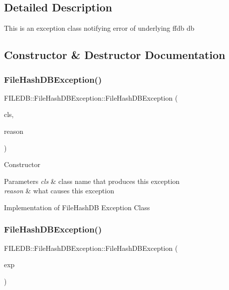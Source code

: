 \subsection{Detailed Description}
This is an exception class notifying error of underlying ffdb db 

\subsection{Constructor \& Destructor Documentation}
\mbox{\label{classFILEDB_1_1FileHashDBException_ae549056e12f10f0bb24e0875a70ec57b}} 
\subsubsection{\texorpdfstring{FileHashDBException()}{FileHashDBException()}\hspace{0.1cm}{\footnotesize\ttfamily [1/9]}}
{\footnotesize\ttfamily F\+I\+L\+E\+D\+B\+::\+File\+Hash\+D\+B\+Exception\+::\+File\+Hash\+D\+B\+Exception (\begin{DoxyParamCaption}\item[{const std\+::string \&}]{cls,  }\item[{const std\+::string \&}]{reason }\end{DoxyParamCaption})}

Constructor 
\begin{DoxyParams}{Parameters}
{\em cls} & class name that produces this exception \\
\hline
{\em reason} & what causes this exception\\
\hline
\end{DoxyParams}
Implementation of File\+Hash\+DB Exception Class \mbox{\label{classFILEDB_1_1FileHashDBException_ad018a7bda0cfd93d2efac5c16c10886e}} 
\subsubsection{\texorpdfstring{FileHashDBException()}{FileHashDBException()}\hspace{0.1cm}{\footnotesize\ttfamily [2/9]}}
{\footnotesize\ttfamily F\+I\+L\+E\+D\+B\+::\+File\+Hash\+D\+B\+Exception\+::\+File\+Hash\+D\+B\+Exception (\begin{DoxyParamCaption}\item[{const \mbox{\hyperlink{classFILEDB_1_1FileHashDBException}{File\+Hash\+D\+B\+Exception}} \&}]{exp }\end{DoxyParamCaption})}

